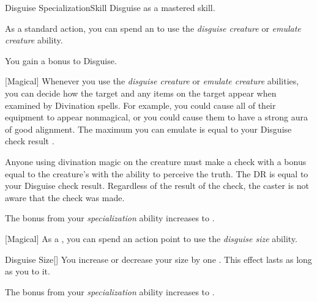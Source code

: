     \begin{feat}{Disguise Specialization}{Skill}
        \featpre Disguise as a mastered skill.

         As a standard action, you can spend an  to use the \textit{disguise creature} or \textit{emulate creature} ability.

         You gain a  bonus to Disguise.

        [Magical] Whenever you use the \textit{disguise creature} or \textit{emulate creature} abilities, you can decide how the target and any items on the target appear when examined by Divination spells.
        For example, you could cause all of their equipment to appear nonmagical, or you could cause them to have a strong aura of good alignment.
        The maximum  you can emulate is equal to your Disguise check result .

        Anyone using divination magic on the creature must make a check with a bonus equal to the creature's  with the ability to perceive the truth.
        The DR is equal to your Disguise check result.
        Regardless of the result of the check, the caster is not aware that the check was made.

         The bonus from your \textit{specialization} ability increases to .

        [Magical] As a , you can spend an action point to use the \textit{disguise size} ability.
        \begin{ability}{Disguise Size}[]
            You increase or decrease your size by one .
            This effect lasts as long as you  to it.
        \end{ability}

         The bonus from your \textit{specialization} ability increases to .
    \end{feat}

